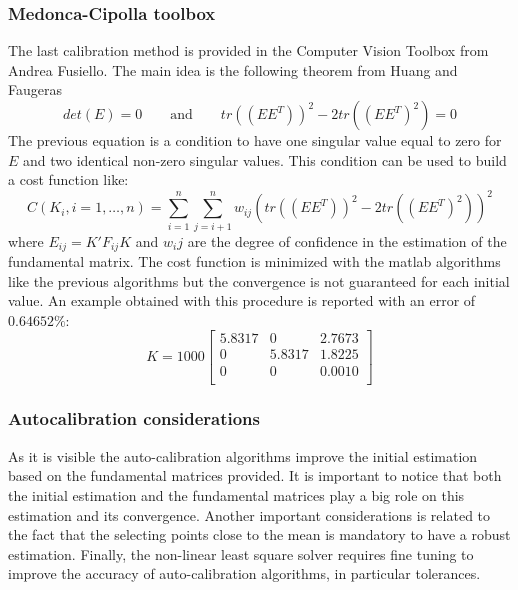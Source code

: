\documentclass[11pt]{article}
\begin{document}
\subsubsection{Medonca-Cipolla toolbox}
The last calibration method is provided in the Computer Vision Toolbox from Andrea Fusiello. The main idea is the following theorem from Huang and Faugeras \cite{Faugeras89}
\begin{equation}
    det(E) = 0 \qquad \text{and} \qquad tr((EE^T))^2 - 2 tr((EE^T)^2) = 0
\end{equation}
The previous equation is a condition to have one singular value equal to zero for $E$ and two identical non-zero singular values. This condition can be used to build a cost function like:
\begin{equation}
    C(K_i, i = 1,\dots, n) = \sum_{i=1}^{n} \sum_{j=i+1}^{n} w_{ij} (tr((EE^T))^2 - 2 tr((EE^T)^2))^2
\end{equation}
where $E_{ij} = K'F_{ij}K$ and $w_ij$ are the degree of confidence in the estimation of the fundamental matrix. The cost function is minimized with the matlab algorithms like the previous algorithms but the convergence is not guaranteed for each initial value. An example obtained with this procedure is reported with an error of $0.64652\%$:
\begin{equation}
    K = 1000 \begin{bmatrix}
     5.8317  &       0   & 2.7673\\
          0  &  5.8317   & 1.8225\\
          0  &       0   & 0.0010\\ 
\end{bmatrix}
\end{equation}

\bigskip
\subsubsection{Autocalibration considerations}
As it is visible the auto-calibration algorithms improve the initial estimation based on the fundamental matrices provided. It is important to notice that both the initial estimation and the fundamental matrices play a big role on this estimation and its convergence. Another important considerations is related to the fact that the selecting points close to the mean is mandatory to have a robust estimation. Finally, the non-linear least square solver requires fine tuning to improve the accuracy of auto-calibration algorithms, in particular tolerances.
\end{document}
